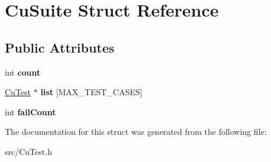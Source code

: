 \hypertarget{struct_cu_suite}{}\section{Cu\+Suite Struct Reference}
\label{struct_cu_suite}
\subsection*{Public Attributes}
\begin{DoxyCompactItemize}
\item 
\mbox{\label{struct_cu_suite_a44b3a5aa4c9b027a6c680c78cdcb9da4}} 
int {\bfseries count}
\item 
\mbox{\label{struct_cu_suite_a16efbf8411fefbfe58e3c1f7f741241c}} 
\hyperlink{struct_cu_test}{Cu\+Test} $\ast$ {\bfseries list} \mbox{[}M\+A\+X\+\_\+\+T\+E\+S\+T\+\_\+\+C\+A\+S\+ES\mbox{]}
\item 
\mbox{\label{struct_cu_suite_ac768ec100a0423c8e9e9a0859c5c5dbd}} 
int {\bfseries fail\+Count}
\end{DoxyCompactItemize}


The documentation for this struct was generated from the following file\+:\begin{DoxyCompactItemize}
\item 
src/Cu\+Test.\+h\end{DoxyCompactItemize}
